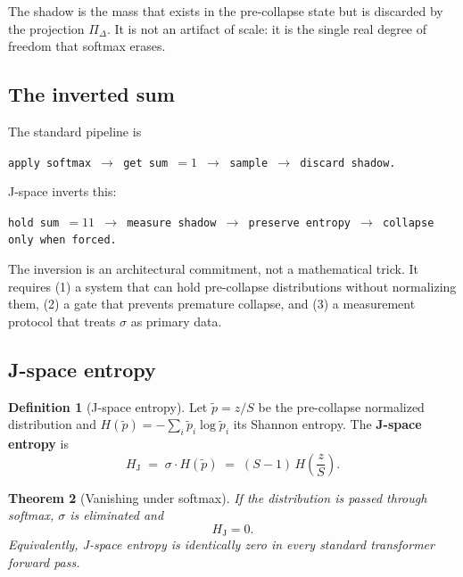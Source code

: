 \documentclass[11pt]{article}
\newtheorem{theorem}{Theorem}[section]
\theoremstyle{definition}
\newtheorem{definition}[theorem]{Definition}
\newcommand{\Hj}{H_{\mathrm{J}}}
\newcommand{\shadow}{\sigma}
\newcommand{\pth}{\tilde{p}}
\begin{document}
The shadow is the mass that exists in the pre-collapse state but is discarded
by the projection $\Pi_{\Delta}$. It is not an artifact of scale: it is the
single real degree of freedom that softmax erases.

\subsection{The inverted sum}

The standard pipeline is

\begin{center}
  \texttt{apply softmax $\to$ get sum $= 1$ $\to$ sample $\to$ discard shadow.}
\end{center}

\noindent J-space inverts this:

\begin{center}
  \texttt{hold sum $= 11$ $\to$ measure shadow $\to$ preserve entropy $\to$
  collapse only when forced.}
\end{center}

The inversion is an architectural commitment, not a mathematical trick. It
requires (1) a system that can hold pre-collapse distributions without
normalizing them, (2) a gate that prevents premature collapse, and (3) a
measurement protocol that treats $\shadow$ as primary data.

\subsection{J-space entropy}
\label{sec:hj}

\begin{definition}[J-space entropy]
\label{def:hj}
  Let $\pth = z/S$ be the pre-collapse normalized distribution and
  $H(\pth) = -\sum_i \pth_i \log \pth_i$ its Shannon entropy. The
  \textbf{J-space entropy} is
  \begin{equation}
    \Hj \;=\; \shadow \cdot H(\pth) \;=\; (S - 1)\, H\!\left(\frac{z}{S}\right).
  \end{equation}
\end{definition}

\begin{theorem}[Vanishing under softmax]
\label{thm:hj-zero}
  If the distribution is passed through softmax, $\shadow$ is eliminated and
  \begin{equation}
    \Hj = 0.
  \end{equation}
  Equivalently, J-space entropy is identically zero in every standard
  transformer forward pass.
\end{theorem}
\end{document}
